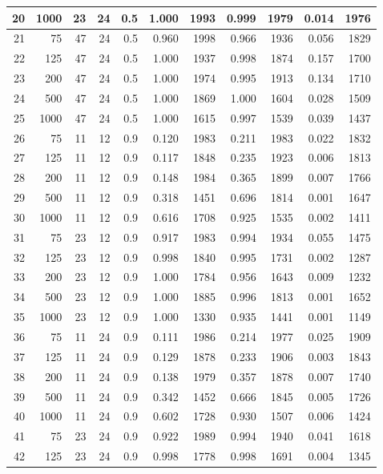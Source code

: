 \documentclass{article}
\begin{document}
\begin{tabular}{rrrrrrrrrrr}
  20 & 1000 & 23 & 24 & 0.5 & 1.000 & 1993 & 0.999 & 1979 & 0.014 & 1976 \\ 
   \hline
21 & 75 & 47 & 24 & 0.5 & 0.960 & 1998 & 0.966 & 1936 & 0.056 & 1829 \\ 
  22 & 125 & 47 & 24 & 0.5 & 1.000 & 1937 & 0.998 & 1874 & 0.157 & 1700 \\ 
  23 & 200 & 47 & 24 & 0.5 & 1.000 & 1974 & 0.995 & 1913 & 0.134 & 1710 \\ 
  24 & 500 & 47 & 24 & 0.5 & 1.000 & 1869 & 1.000 & 1604 & 0.028 & 1509 \\ 
  25 & 1000 & 47 & 24 & 0.5 & 1.000 & 1615 & 0.997 & 1539 & 0.039 & 1437 \\ 
   \hline
26 & 75 & 11 & 12 & 0.9 & 0.120 & 1983 & 0.211 & 1983 & 0.022 & 1832 \\ 
  27 & 125 & 11 & 12 & 0.9 & 0.117 & 1848 & 0.235 & 1923 & 0.006 & 1813 \\ 
  28 & 200 & 11 & 12 & 0.9 & 0.148 & 1984 & 0.365 & 1899 & 0.007 & 1766 \\ 
  29 & 500 & 11 & 12 & 0.9 & 0.318 & 1451 & 0.696 & 1814 & 0.001 & 1647 \\ 
  30 & 1000 & 11 & 12 & 0.9 & 0.616 & 1708 & 0.925 & 1535 & 0.002 & 1411 \\ 
   \hline
31 & 75 & 23 & 12 & 0.9 & 0.917 & 1983 & 0.994 & 1934 & 0.055 & 1475 \\ 
  32 & 125 & 23 & 12 & 0.9 & 0.998 & 1840 & 0.995 & 1731 & 0.002 & 1287 \\ 
  33 & 200 & 23 & 12 & 0.9 & 1.000 & 1784 & 0.956 & 1643 & 0.009 & 1232 \\ 
  34 & 500 & 23 & 12 & 0.9 & 1.000 & 1885 & 0.996 & 1813 & 0.001 & 1652 \\ 
  35 & 1000 & 23 & 12 & 0.9 & 1.000 & 1330 & 0.935 & 1441 & 0.001 & 1149 \\ 
   \hline
36 & 75 & 11 & 24 & 0.9 & 0.111 & 1986 & 0.214 & 1977 & 0.025 & 1909 \\ 
  37 & 125 & 11 & 24 & 0.9 & 0.129 & 1878 & 0.233 & 1906 & 0.003 & 1843 \\ 
  38 & 200 & 11 & 24 & 0.9 & 0.138 & 1979 & 0.357 & 1878 & 0.007 & 1740 \\ 
  39 & 500 & 11 & 24 & 0.9 & 0.342 & 1452 & 0.666 & 1845 & 0.005 & 1726 \\ 
  40 & 1000 & 11 & 24 & 0.9 & 0.602 & 1728 & 0.930 & 1507 & 0.006 & 1424 \\ 
   \hline
41 & 75 & 23 & 24 & 0.9 & 0.922 & 1989 & 0.994 & 1940 & 0.041 & 1618 \\ 
  42 & 125 & 23 & 24 & 0.9 & 0.998 & 1778 & 0.998 & 1691 & 0.004 & 1345 \\ 

\end{tabular}
\end{document}

